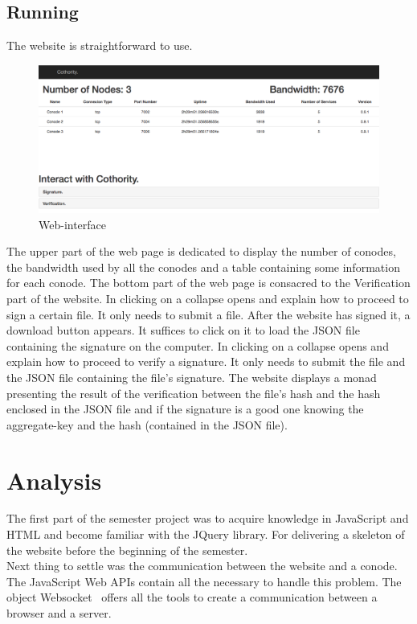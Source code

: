 \documentclass[11pt, a4paper, twoside, openright, openany]{article} %
\begin{document}
\subsection{Running}
The website is straightforward to use.
\newline

\begin{figure}[ht!]
\centering
\includegraphics[width=125mm]{interface.jpg}
\caption{Web-interface}
\end{figure}
\leavevmode \newline

The upper part of the web page is dedicated to display the number of conodes, the bandwidth used by all the conodes and
a table containing some information for each conode.
\newline \newline
The bottom part of the web page is consacred to the Verification part of the website.
\newline
In clicking on  a collapse opens and explain how to proceed to sign a certain file.
It only needs to submit a file. After the website has signed it, a download button appears.
It suffices to click on it to load the JSON file containing the signature on the computer.
\newline
In clicking on  a collapse opens and explain how to proceed to verify a signature.
It only needs to submit the file and the JSON file containing the file's signature.
The website displays a monad presenting the result of the verification between the file's hash and the hash enclosed in the JSON file
and if the signature is a good one knowing the aggregate-key and the hash (contained in the JSON file).
\bigbreak

\iffalse

\section{Analysis}
The first part of the semester project was to acquire knowledge in JavaScript and
HTML and become familiar with the JQuery library. For delivering a skeleton of
the website before the beginning of the semester.\\
Next thing to settle was the communication between the website and a conode.
The JavaScript Web APIs contain all the necessary to handle this problem.
The object Websocket~\cite{websocketPage} offers all the tools to create a
communication between a browser and a server.\\
\end{document}
